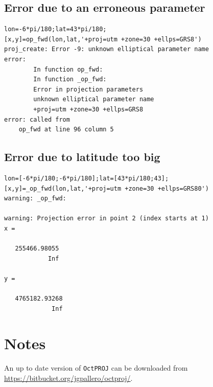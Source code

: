 \documentclass[10pt,a4paper]{article}
\newcommand{\octproj}{\texttt{OctPROJ}}
\begin{document}
\subsection{Error due to an erroneous parameter}

\begin{verbatim}
lon=-6*pi/180;lat=43*pi/180;
[x,y]=op_fwd(lon,lat,'+proj=utm +zone=30 +ellps=GRS8')
proj_create: Error -9: unknown elliptical parameter name
error:
        In function op_fwd:
        In function _op_fwd:
        Error in projection parameters
        unknown elliptical parameter name
        +proj=utm +zone=30 +ellps=GRS8
error: called from
    op_fwd at line 96 column 5
\end{verbatim}

\subsection{Error due to latitude too big}

\begin{verbatim}
lon=[-6*pi/180;-6*pi/180];lat=[43*pi/180;43];
[x,y]=_op_fwd(lon,lat,'+proj=utm +zone=30 +ellps=GRS80')
warning: _op_fwd:

warning: Projection error in point 2 (index starts at 1)
x =

   255466.98055
            Inf

y =

   4765182.93268
             Inf
\end{verbatim}

\section{Notes}

An up to date version of \octproj{} can be downloaded from
\url{https://bitbucket.org/jgpallero/octproj/}.
\end{document}
